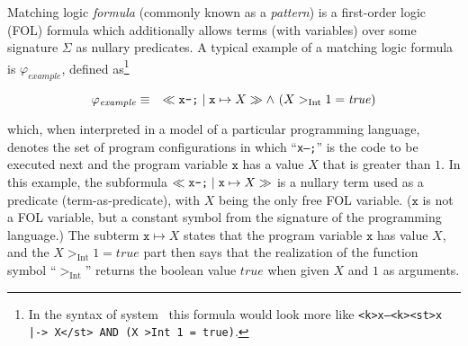 

Matching logic \emph{formula} (commonly known as a \emph{pattern}) is a
first-order logic (FOL) formula which additionally allows terms (with variables)
over some signature $\Sigma$ as nullary predicates.
A typical example of a matching logic formula is $\varphi_{\mathit{example}}$,
defined as\footnote{In the syntax of system \K\ this formula would look more like
\texttt{<k>x--<k><st>x |-> X</st> AND (X >Int  1 = true)}.}


\begin{equation}\label{eqn:exampleMLPattern}
    \varphi_{\mathit{example}} \equiv\quad \ll\texttt{x--;}\mid \texttt{x}\mapsto X\gg  \land\ (X >_\text{Int} 1 = \mathit{true})
\end{equation}


which, when interpreted in a model of a particular programming language,
denotes the set of program configurations in which ``\texttt{x--;}'' is the
code to be executed next and the program variable $\texttt{x}$ has a value $X$
that is greater than $1$.  In this example, the subformula
$\ll\texttt{x--;}\mid \mathtt{x}\mapsto X\gg$ is a nullary term used as a predicate
(term-as-predicate), with $X$ being the only free FOL variable.  ($\texttt{x}$
is not a FOL variable, but a constant symbol from the signature of the
programming language.)  The subterm $\texttt{x}\mapsto X$ states that the
program variable $\texttt{x}$ has value $X$, and the
$X >_\text{Int} 1 = \mathit{true}$ part then says that the realization of the
function symbol ``$>_\text{Int}$'' returns the boolean value $\mathit{true}$
when given $X$ and $1$ as arguments.

